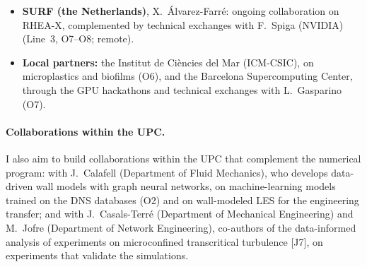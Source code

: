 \documentclass[11pt]{article}
\begin{document}
\begin{itemize}
  shear-free flows at high Reynolds numbers~\cite{Silva2018,Alves2025}; single-fluid transcritical
  jets have been simulated~\cite{Lapenna2019,Ream2025}, but their interfaces have not been analyzed,
  although pseudo-boiling changes density, viscosity and diffusivity precisely across them.
  \item \textbf{SURF (the Netherlands)}, X.\ \'Alvarez-Farr\'e: ongoing collaboration on RHEA-X,
  complemented by technical exchanges with F.\ Spiga (NVIDIA) (Line~3, O7--O8; remote).
  \item \textbf{Local partners:} the Institut de Ci\`encies del Mar (ICM-CSIC), on microplastics and
  biofilms (O6), and the Barcelona Supercomputing Center, through the GPU hackathons and technical exchanges with L.\ Gasparino (O7).
\end{itemize}

\paragraph{Collaborations within the UPC.} I also aim to build collaborations within the UPC that
complement the numerical program: with J.\ Calafell (Department of Fluid Mechanics), who develops
data-driven wall models with graph neural networks, on machine-learning models trained on the DNS
databases (O2) and on wall-modeled LES for the engineering transfer; and with J.\ Casals-Terr\'e
(Department of Mechanical Engineering) and M.\ Jofre (Department of Network Engineering), co-authors
of the data-informed analysis of experiments on microconfined transcritical turbulence [J7], on
experiments that validate the simulations.
\end{document}
